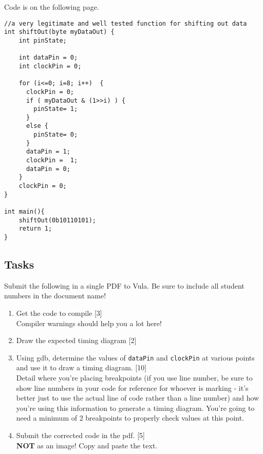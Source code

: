 Code is on the following page.

\newpage
\begin{lstlisting}
//a very legitimate and well tested function for shifting out data
int shiftOut(byte myDataOut) {
    int pinState;
	
    int dataPin = 0;
    int clockPin = 0;
    
    for (i<=0; i=8; i++)  {
      clockPin = 0;
      if ( myDataOut & (1>>i) ) {
        pinState= 1;
      }
      else {  
        pinState= 0;
      }
      dataPin = 1;
      clockPin =  1;
      dataPin = 0;
    }
    clockPin = 0;
}

int main(){
    shiftOut(0b10110101);
	return 1;
}
\end{lstlisting}

\subsection{Tasks}
Submit the following in a single PDF to Vula. Be sure to include all student numbers in the document name!
\begin{enumerate}
    \item Get the code to compile [3]\\
        Compiler warnings should help you a lot here!
    \item Draw the expected timing diagram [2]
    \item Using gdb, determine the values of \verb|dataPin| and \verb|clockPin| at various points and use it to draw a timing diagram. [10]\\
    Detail where you're placing breakpoints (if you use line number, be sure to show line numbers in your code for reference for whoever is marking - it's better just to use the actual line of code rather than a line number) and how you're using this information to generate a timing diagram. You're going to need a minimum of 2 breakpoints to properly check values at this point.
    \item Submit the corrected code in the pdf. [5]\\
    \textbf{NOT} as an image! Copy and paste the text.
\end{enumerate}